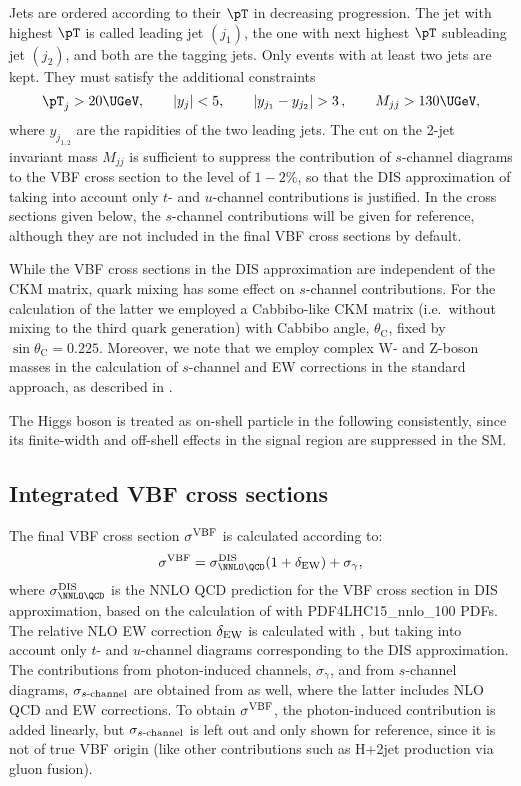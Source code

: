 Jets are ordered according to their $\pT$ in decreasing
progression. The jet with highest $\pT$ is called leading jet $(j_1)$, the
one with next highest $\pT$ subleading jet $(j_2)$, and both are the tagging
jets.  Only events with at least two jets are kept.  They must satisfy
the additional constraints
%
\begin{equation}
\label{eq:VBF_cuts2}
{\pT}_j > 20\UGeV, \qquad 
|y_j| < 5, \qquad 
|y_{j_1} - y_{j_2}| > 3\,, \qquad M_{jj} > 130\UGeV,
\end{equation}
where $y_{j_{1,2}}$ are the rapidities of the two leading jets.
The cut on the 2-jet invariant mass $M_{jj}$ is sufficient to suppress
the contribution of $s$-channel diagrams to the VBF cross section
to the level of $1{-}2\%$, so that the DIS approximation of
taking into account only $t$- and $u$-channel contributions is justified.
In the cross sections given below, the $s$-channel contributions will be given
for reference, although they are not included in the final VBF cross sections
by default.

While the VBF cross sections in the DIS approximation are independent
of the CKM matrix, quark mixing has some effect on $s$-channel contributions.
For the calculation of the latter we employed a Cabbibo-like CKM matrix
(i.e.\ without mixing to the third quark generation) with Cabbibo angle,
$\theta_{\mathrm{C}}$, fixed by $\sin\theta_{\mathrm{C}}=0.225$.
Moreover, we note that we employ complex W- and Z-boson masses in the
calculation of $s$-channel and EW corrections in the standard \HAWK{} approach, 
as described in 
.

The Higgs boson is treated as on-shell particle in the following consistently,
since its finite-width and off-shell effects in the signal region are
suppressed in the SM.

\subsection{Integrated VBF cross sections}
\label{subsec:VBF-XS}

The final VBF cross section $\sigma^{\mathrm{VBF}}$ is calculated according to:
\begin{equation}
\sigma^{\VBF} = \sigma_{\NNLO \QCD}^{\DIS} (1+\delta_{\ELWK}) + \sigma_{\gamma},
\label{eq:sigmaVBF}
\end{equation}
where $\sigma_{\NNLO \QCD}^{\DIS}$ is the NNLO QCD prediction for the
VBF cross section in DIS approximation, based on the calculation
of  with PDF4LHC15\_nnlo\_100 PDFs.  The
relative NLO EW correction $\delta_{\mathrm{EW}}$ is calculated with
\HAWK{}, but taking into account only $t$- and $u$-channel diagrams
corresponding to the DIS approximation.  The contributions from
photon-induced channels, $\sigma_{\gamma}$, and from $s$-channel
diagrams, $\sigma_{\mbox{\scriptsize $s$-channel}}$ are obtained from
\HAWK{} as well, where the latter includes NLO QCD and EW corrections.
To obtain $\sigma^{\mathrm{VBF}}$, the photon-induced contribution is added
linearly, but $\sigma_{\mbox{\scriptsize $s$-channel}}$ is left out
and only shown for reference, since it is not of true VBF origin (like
other contributions such as H+2jet production via gluon fusion).  

